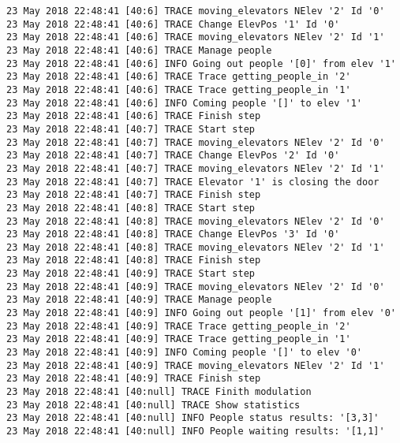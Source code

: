 \begin{lstlisting}
23 May 2018 22:48:41 [40:6] TRACE moving_elevators NElev '2' Id '0'
23 May 2018 22:48:41 [40:6] TRACE Change ElevPos '1' Id '0'
23 May 2018 22:48:41 [40:6] TRACE moving_elevators NElev '2' Id '1'
23 May 2018 22:48:41 [40:6] TRACE Manage people
23 May 2018 22:48:41 [40:6] INFO Going out people '[0]' from elev '1'
23 May 2018 22:48:41 [40:6] TRACE Trace getting_people_in '2'
23 May 2018 22:48:41 [40:6] TRACE Trace getting_people_in '1'
23 May 2018 22:48:41 [40:6] INFO Coming people '[]' to elev '1'
23 May 2018 22:48:41 [40:6] TRACE Finish step
23 May 2018 22:48:41 [40:7] TRACE Start step
23 May 2018 22:48:41 [40:7] TRACE moving_elevators NElev '2' Id '0'
23 May 2018 22:48:41 [40:7] TRACE Change ElevPos '2' Id '0'
23 May 2018 22:48:41 [40:7] TRACE moving_elevators NElev '2' Id '1'
23 May 2018 22:48:41 [40:7] TRACE Elevator '1' is closing the door
23 May 2018 22:48:41 [40:7] TRACE Finish step
23 May 2018 22:48:41 [40:8] TRACE Start step
23 May 2018 22:48:41 [40:8] TRACE moving_elevators NElev '2' Id '0'
23 May 2018 22:48:41 [40:8] TRACE Change ElevPos '3' Id '0'
23 May 2018 22:48:41 [40:8] TRACE moving_elevators NElev '2' Id '1'
23 May 2018 22:48:41 [40:8] TRACE Finish step
23 May 2018 22:48:41 [40:9] TRACE Start step
23 May 2018 22:48:41 [40:9] TRACE moving_elevators NElev '2' Id '0'
23 May 2018 22:48:41 [40:9] TRACE Manage people
23 May 2018 22:48:41 [40:9] INFO Going out people '[1]' from elev '0'
23 May 2018 22:48:41 [40:9] TRACE Trace getting_people_in '2'
23 May 2018 22:48:41 [40:9] TRACE Trace getting_people_in '1'
23 May 2018 22:48:41 [40:9] INFO Coming people '[]' to elev '0'
23 May 2018 22:48:41 [40:9] TRACE moving_elevators NElev '2' Id '1'
23 May 2018 22:48:41 [40:9] TRACE Finish step
23 May 2018 22:48:41 [40:null] TRACE Finith modulation
23 May 2018 22:48:41 [40:null] TRACE Show statistics
23 May 2018 22:48:41 [40:null] INFO People status results: '[3,3]'
23 May 2018 22:48:41 [40:null] INFO People waiting results: '[1,1]'
\end{lstlisting}
